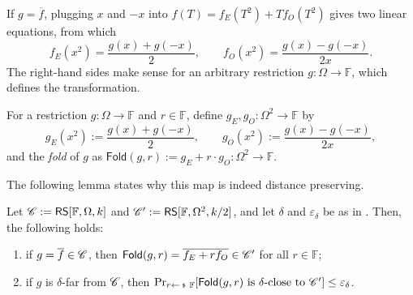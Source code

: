 \documentclass[../../book]{subfiles}
\begin{document}
If $g = \overline{f}$, plugging $x$ and $-x$ into $f(T) = f_E(T^2) + T f_O(T^2)$ gives two linear equations, from which
\begin{equation*}
    f_E(x^2) = \frac{g(x) + g(-x)}{2}, \qquad f_O(x^2) = \frac{g(x) - g(-x)}{2x}.
\end{equation*}
The right-hand sides make sense for an arbitrary restriction $g: \Omega \to \mathbb{F}$, which defines the transformation.

\begin{definition}\label{def:fold}
    For a restriction $g: \Omega \to \mathbb{F}$ and $r \in \mathbb{F}$, define $g_E, g_O: \Omega^2 \to \mathbb{F}$ by
    \begin{equation*}
        g_E(x^2) := \frac{g(x) + g(-x)}{2}, \qquad g_O(x^2) := \frac{g(x) - g(-x)}{2x},
    \end{equation*}
    and the \emph{fold} of $g$ as $\mathsf{Fold}(g, r) := g_E + r \cdot g_O: \Omega^2 \to \mathbb{F}$.
\end{definition}

The following lemma states why this map is indeed distance preserving.

\begin{lemma}\label{lemma:two-way-folding}
    Let $\mathscr{C} := \mathsf{RS}[\mathbb{F},\Omega,k]$ and $\mathscr{C}' := \mathsf{RS}[\mathbb{F},\Omega^2,k/2]$, and let $\delta$ and $\varepsilon_\delta$ be as in . Then, the following holds:
    \begin{enumerate}
        \item if $g = \overline{f} \in \mathscr{C}$, then $\mathsf{Fold}(g, r) = \overline{f_E + r f_O} \in \mathscr{C}'$ for all $r \in \mathbb{F}$;
        \item if $g$ is $\delta$-far from $\mathscr{C}$, then $\Pr_{r \leftarrowS \mathbb{F}}[\mathsf{Fold}(g, r) \text{ is } \delta\text{-close to } \code'] \leq \varepsilon_{\delta}$.
    \end{enumerate}
\end{lemma}
\end{document}
